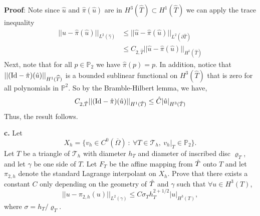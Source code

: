 \documentclass[11pt]{article}
\begin{document}
{\bf Proof}: Note since $\hat{u}$ and $\hat{\pi}(\hat{u})$ are in $H^3(\widehat{T})\subset H^1(\widehat{T})$ we can apply the trace inequality
\begin{align*}
	||\hat{u} - \hat{\pi}(\hat{u})||_{L^2(\hat{\gamma})} &\leq ||\hat{u} - \hat{\pi}(\hat{u})||_{L^2(\partial\widehat{T})} \\
	&\leq C_{2,\hat{T}}||\hat{u} - \hat{\pi}(\hat{u})||_{H^1(\widehat{T})}
\end{align*}
Next, note that for all $p \in \mathbb{P}_2$ we have $\hat{\pi}(p) = p$.
In addition, notice that $||(\text{Id} - \Hat{\pi})(\Hat{u})||_{H^1(\widehat{T})}$ is a bounded sublinear functional on $H^3(\widehat{T})$ that is zero for all polynomials in $\mathbb{P}^2$.
So by the Bramble-Hilbert lemma, we have,
\begin{equation}
    C_{2,\Hat{T}}||(\text{Id} - \Hat{\pi})(\Hat{u})||_{H^1(\Hat{T})} \leq \Hat{C} |\Hat{u}|_{H^3(\Hat{T})}
\end{equation}
Thus, the result follows.


\vskip 2cm




{\bf c.} Let
\begin{equation}
    X_h = \{v_h \in C^0(\overline{\Omega}) \: : \: \forall T \in \mathcal{T}_h, \: v_h|_T \in \mathbb{P}_2 \}.
\end{equation}
Let $T$ be a triangle of $\mathcal{T}_h$ with diameter $h_T$ and diameter of inscribed disc $\varrho_T$, and let $\gamma$ be one side of $T$.
Let $F_T$ be the affine mapping from $\Hat{T}$ onto $T$ and let $\pi_{2,h}$ denote the standard Lagrange interpolant on $X_h$.  
Prove that there exists a constant $C$ only depending on the geometry of $\Hat{T}$ and $\gamma$ such that $\forall u \in H^3(T)$,
\begin{equation}
    ||u - \pi_{2,h}(u)||_{L^2(\gamma)} \leq C \sigma_T h_T^{2 + 1/2} |u|_{H^3(T)},
\end{equation}
where $\sigma = h_T/\varrho_T$.

\vskip 1cm
\end{document}
